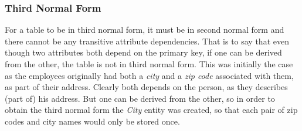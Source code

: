 \subsubsection{Third Normal Form}
For a table to be in third normal form, it must be in second normal form and 
there cannot be any transitive attribute dependencies. That is to say that even 
though two attributes both depend on the primary key, if one can be derived 
from the other, the table is not in third normal form. This was initially the 
case as the employees originally had both a \emph{city} and a \emph{zip code} 
associated with them, as part of their address. Clearly both depends on the 
person, as they describes (part of) his address. But one can be derived from 
the other, so in order to obtain the third normal form the \emph{City} entity 
was created, so that each pair of zip codes and city names would only be stored 
once.

